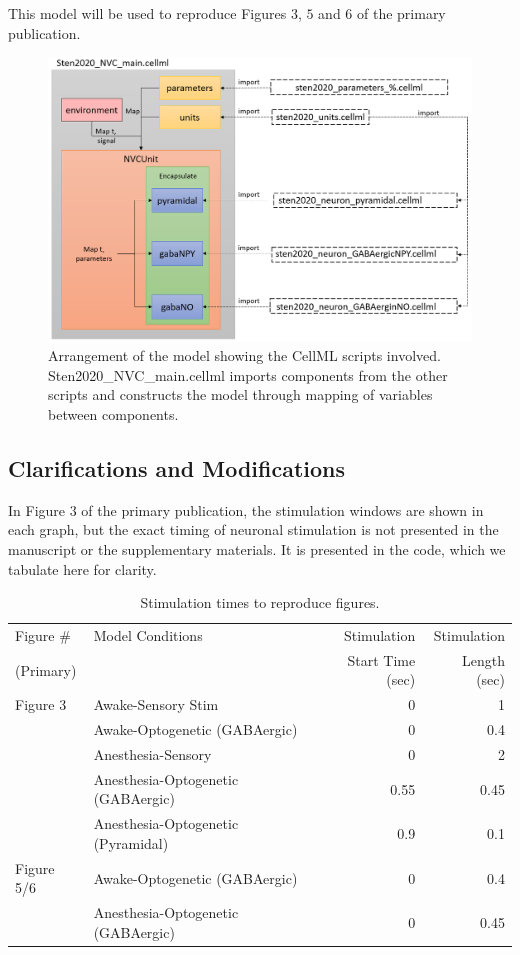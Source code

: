 \documentclass[fleqn,10pt]{physiome}
\begin{document}
This model will be used to reproduce Figures $3$, $5$ and $6$ of the primary publication.

\begin{figure}[htbp]
    \centering
    \includegraphics[scale=0.4, keepaspectratio]{Figure0.png}
    \caption{Arrangement of the model showing the CellML scripts involved. Sten2020\_NVC\_main.cellml imports components from the other scripts and constructs the model through mapping of variables between components.}
    \label{fig:1}
\end{figure}

\subsection{Clarifications and Modifications}

In Figure $3$ of the primary publication, the stimulation windows are shown in each graph, but the exact timing of neuronal stimulation is not presented in the manuscript or the supplementary materials. It is presented in the code, which we tabulate here for clarity. 

\begin{table}[htb]
    \centering
    \caption{Stimulation times to reproduce figures.}\label{table:1}
    \begin{tabular}{l l r r}
        \toprule
        Figure \# & Model Conditions & Stimulation& Stimulation\\
        (Primary) &  &  Start Time (sec) &  Length (sec) \\\bottomrule
        Figure 3  & Awake-Sensory Stim & 0 & 1\\
        & Awake-Optogenetic (GABAergic) & 0 & 0.4\\
        & Anesthesia-Sensory & 0 & 2\\
        & Anesthesia-Optogenetic (GABAergic) & 0.55 & 0.45\\
        & Anesthesia-Optogenetic (Pyramidal) & 0.9 & 0.1\\\toprule
        Figure 5/6 & Awake-Optogenetic (GABAergic) & 0 & 0.4\\
        & Anesthesia-Optogenetic (GABAergic) & 0 & 0.45\\
        \bottomrule
    \end{tabular}
\end{table}
\end{document}
